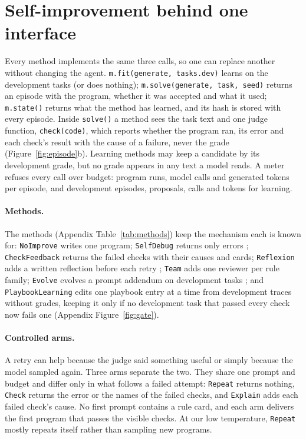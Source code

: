 \section{Self-improvement behind one interface}
\label{sec:methods}

Every method implements the same three calls, so one can replace another without changing the
agent. \texttt{m.fit(generate, tasks.dev)} learns on the development tasks (or does nothing);
\texttt{m.solve(generate, task, seed)} returns an episode with the program, whether it was
accepted and what it used; \texttt{m.state()} returns what the method has learned, and its hash
is stored with every episode. Inside \texttt{solve()} a method sees the task text and one judge
function, \texttt{check(code)}, which reports whether the program ran, its error and each check's
result with the cause of a failure, never the grade (Figure~\ref{fig:episode}b). Learning
methods may keep a candidate by its development grade, but no grade appears in any text a model
reads. A meter refuses every call over budget: \BudgetAttempts{} program runs, \BudgetCalls{}
model calls and \BudgetTokens{} generated tokens per episode, and \FitEpisodes{} development
episodes, \FitProposals{} proposals, \FitCalls{} calls and \FitTokens{} tokens for learning.

\paragraph{Methods.}
The \NMethods{} methods (Appendix Table~\ref{tab:methods}) keep the mechanism each is known
for: \texttt{NoImprove} writes one program; \texttt{SelfDebug} returns only errors
\citep{chen2024selfdebug}; \texttt{CheckFeedback} returns the failed checks with their causes
and cards; \texttt{Reflexion} adds a written reflection before each retry
\citep{shinn2023reflexion}; \texttt{Team} adds one reviewer per rule family; \texttt{Evolve}
evolves a prompt addendum on development tasks \citep{agrawal2026gepa}; and
\texttt{PlaybookLearning} \citep{zhao2024expel,suzgun2026dynamic} edits one playbook entry at a
time from development traces without grades, keeping it only if no development task that
passed every check now fails one (Appendix Figure~\ref{fig:gate}).

\paragraph{Controlled arms.}
A retry can help because the judge said something useful or simply because the model sampled
again. Three arms separate the two. They share one prompt and budget and differ only in what
follows a failed attempt: \texttt{Repeat} returns nothing, \texttt{Check} returns the error or
the names of the failed checks, and \texttt{Explain} adds each failed check's cause. No first
prompt contains a rule card, and each arm delivers the first program that passes the visible
checks. At our low temperature, \texttt{Repeat} mostly repeats itself rather than sampling new
programs.
